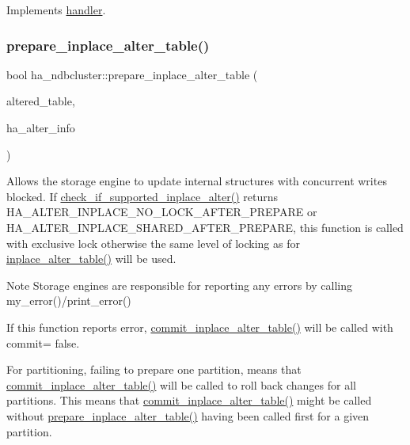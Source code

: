 Implements \mbox{\hyperlink{classhandler}{handler}}.

\mbox{\label{classha__ndbcluster_a3d7235ae7ee13ad3a572af0fd5c15291}} 
\subsubsection{\texorpdfstring{prepare\+\_\+inplace\+\_\+alter\+\_\+table()}{prepare\_inplace\_alter\_table()}}
{\footnotesize\ttfamily bool ha\+\_\+ndbcluster\+::prepare\+\_\+inplace\+\_\+alter\+\_\+table (\begin{DoxyParamCaption}\item[{\mbox{\hyperlink{structTABLE}{T\+A\+B\+LE}} $\ast$}]{altered\+\_\+table,  }\item[{\mbox{\hyperlink{classAlter__inplace__info}{Alter\+\_\+inplace\+\_\+info}} $\ast$}]{ha\+\_\+alter\+\_\+info }\end{DoxyParamCaption})\hspace{0.3cm}{\ttfamily [virtual]}}

Allows the storage engine to update internal structures with concurrent writes blocked. If \mbox{\hyperlink{classha__ndbcluster_a178fe8e973508932db3d3d6ca3a625a9}{check\+\_\+if\+\_\+supported\+\_\+inplace\+\_\+alter()}} returns H\+A\+\_\+\+A\+L\+T\+E\+R\+\_\+\+I\+N\+P\+L\+A\+C\+E\+\_\+\+N\+O\+\_\+\+L\+O\+C\+K\+\_\+\+A\+F\+T\+E\+R\+\_\+\+P\+R\+E\+P\+A\+RE or H\+A\+\_\+\+A\+L\+T\+E\+R\+\_\+\+I\+N\+P\+L\+A\+C\+E\+\_\+\+S\+H\+A\+R\+E\+D\+\_\+\+A\+F\+T\+E\+R\+\_\+\+P\+R\+E\+P\+A\+RE, this function is called with exclusive lock otherwise the same level of locking as for \mbox{\hyperlink{classha__ndbcluster_a5ff1e368997d6822e3285080fade11fe}{inplace\+\_\+alter\+\_\+table()}} will be used.

\begin{DoxyNote}{Note}
Storage engines are responsible for reporting any errors by calling my\+\_\+error()/print\+\_\+error()

If this function reports error, \mbox{\hyperlink{classha__ndbcluster_af55db4a0efc9c99947b72b4bfc83b8ad}{commit\+\_\+inplace\+\_\+alter\+\_\+table()}} will be called with commit= false.

For partitioning, failing to prepare one partition, means that \mbox{\hyperlink{classha__ndbcluster_af55db4a0efc9c99947b72b4bfc83b8ad}{commit\+\_\+inplace\+\_\+alter\+\_\+table()}} will be called to roll back changes for all partitions. This means that \mbox{\hyperlink{classha__ndbcluster_af55db4a0efc9c99947b72b4bfc83b8ad}{commit\+\_\+inplace\+\_\+alter\+\_\+table()}} might be called without \mbox{\hyperlink{classha__ndbcluster_a3d7235ae7ee13ad3a572af0fd5c15291}{prepare\+\_\+inplace\+\_\+alter\+\_\+table()}} having been called first for a given partition.
\end{DoxyNote}

